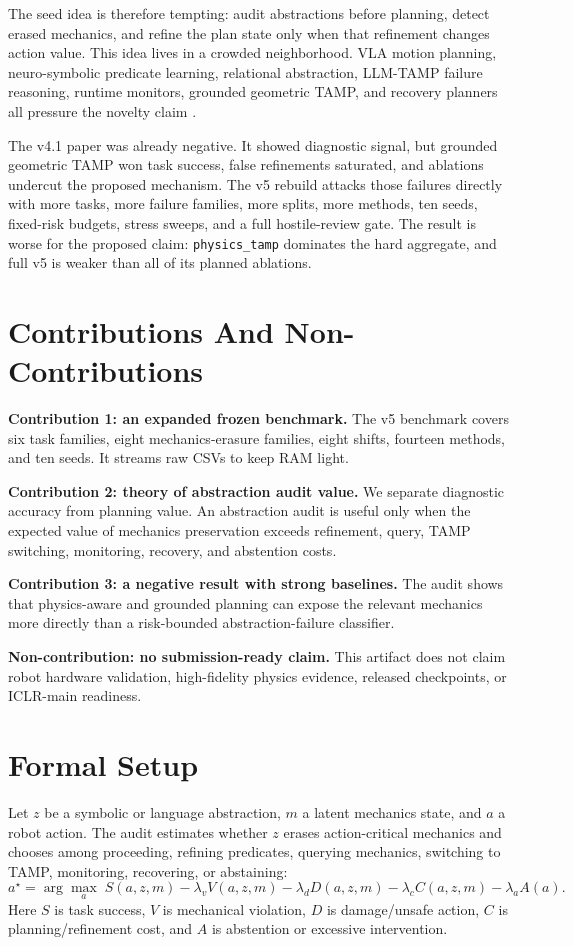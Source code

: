 \documentclass[11pt]{article}
\newcommand{\method}[1]{\texttt{#1}}
\begin{document}
The seed idea is therefore tempting: audit abstractions before planning, detect erased mechanics, and refine the plan state only when that refinement changes action value. This idea lives in a crowded neighborhood. VLA motion planning, neuro-symbolic predicate learning, relational abstraction, LLM-TAMP failure reasoning, runtime monitors, grounded geometric TAMP, and recovery planners all pressure the novelty claim \citep{pang2025integrating7,shao2025breaking8,wu2023embodied9} \citep{shao2024breaking10,chen2026oowm11,liu2026bioproagent12}.

The v4.1 paper was already negative. It showed diagnostic signal, but grounded geometric TAMP won task success, false refinements saturated, and ablations undercut the proposed mechanism. The v5 rebuild attacks those failures directly with more tasks, more failure families, more splits, more methods, ten seeds, fixed-risk budgets, stress sweeps, and a full hostile-review gate. The result is worse for the proposed claim: \method{physics\_tamp} dominates the hard aggregate, and full v5 is weaker than all of its planned ablations.

\section{Contributions And Non-Contributions}
\textbf{Contribution 1: an expanded frozen benchmark.} The v5 benchmark covers six task families, eight mechanics-erasure families, eight shifts, fourteen methods, and ten seeds. It streams raw CSVs to keep RAM light.

\textbf{Contribution 2: theory of abstraction audit value.} We separate diagnostic accuracy from planning value. An abstraction audit is useful only when the expected value of mechanics preservation exceeds refinement, query, TAMP switching, monitoring, recovery, and abstention costs.

\textbf{Contribution 3: a negative result with strong baselines.} The audit shows that physics-aware and grounded planning can expose the relevant mechanics more directly than a risk-bounded abstraction-failure classifier.

\textbf{Non-contribution: no submission-ready claim.} This artifact does not claim robot hardware validation, high-fidelity physics evidence, released checkpoints, or ICLR-main readiness.

\section{Formal Setup}
Let $z$ be a symbolic or language abstraction, $m$ a latent mechanics state, and $a$ a robot action. The audit estimates whether $z$ erases action-critical mechanics and chooses among proceeding, refining predicates, querying mechanics, switching to TAMP, monitoring, recovering, or abstaining:
\[
  a^\star = \arg\max_a \; S(a,z,m) - \lambda_v V(a,z,m) - \lambda_d D(a,z,m) - \lambda_c C(a,z,m) - \lambda_a A(a).
\]
Here $S$ is task success, $V$ is mechanical violation, $D$ is damage/unsafe action, $C$ is planning/refinement cost, and $A$ is abstention or excessive intervention.
\end{document}
